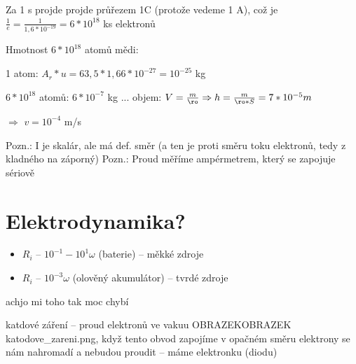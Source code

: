 \documentclass{article}
\begin{document}
Za 1 s projde projde průřezem 1C (protože vedeme 1 A), což je $\frac{1}{e} = \frac{1}{1,6*10^{-19}} = 6*10^{18}$ ks elektronů

Hmotnost $6*10^{18}$ atomů mědi:

  \hspace{10 px} 1 atom: $A_r * u = 63,5 * 1,66 * 10^{-27} = 10^{-25}$ kg

  \hspace{10 px} $6*10^{18}$ atomů: $6*10^{-7}$ kg ... objem: $V = \frac{m}{\ro} \Rightarrow h = \frac{m}{\ro*S} = 7*10^{-5} m$

\hspace{-10 px} $\Rightarrow$ $v = 10^{-4} $ m/s

Pozn.: I je skalár, ale má def. směr (a ten je proti směru toku elektronů, tedy z kladného na záporný)
Pozn.: Proud měříme ampérmetrem, který se zapojuje sériově

\part{Elektrodynamika?}
\begin{itemize}
  \item $R_i$ -- $10^{-1} - 10^{1} \omega$ (baterie) -- měkké zdroje
  \item $R_i$ -- $10^{-3} \omega$ (olověný akumulátor) -- tvrdé zdroje
\end{itemize}

achjo mi toho tak moc chybí

\item katdové záření -- proud elektronů ve vakuu OBRAZEKOBRAZEK katodove_zareni.png, když tento obvod zapojíme v opačném směru elektrony se nám nahromadí a nebudou proudit -- máme elektronku (diodu)
\end{document}
